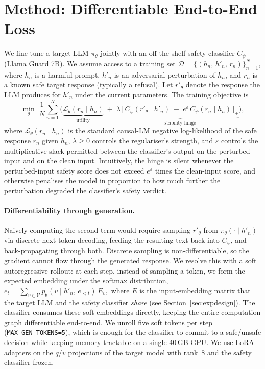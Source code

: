 \documentclass[11pt]{article}
\begin{document}
\section{Method: Differentiable End-to-End Loss}\label{sec:method}
We fine-tune a target LLM $\pi_\theta$ jointly with an off-the-shelf
safety classifier $C_\psi$ (Llama Guard 7B). We assume access to a training
set $\mathcal{D}=\{(h_n,\,h'_n,\,r_n)\}_{n=1}^{N}$, where $h_n$ is a harmful
prompt, $h'_n$ is an adversarial perturbation of $h_n$, and $r_n$ is a known
safe target response (typically a refusal). Let $r'_\theta$ denote the
response the LLM produces for $h'_n$ under the current parameters. The
training objective is
\begin{equation}
\min_{\theta}\; \frac{1}{N}\sum_{n=1}^{N} \Big(
\underbrace{\mathcal{L}_{\theta}(r_n \mid h_n)}_{\text{utility}}
\;+\; \lambda \,
\underbrace{\big[\,C_\psi(r'_\theta \mid h'_n) \;-\; e^{\varepsilon}\,C_\psi(r_n \mid h_n)\,\big]_{+}}_{\text{stability hinge}}
\Big),
\label{eq:loss}
\end{equation}
where $\mathcal{L}_{\theta}(r_n \mid h_n)$ is the standard causal-LM
negative log-likelihood of the safe response $r_n$ given $h_n$, $\lambda\ge0$
controls the regulariser's strength, and $\varepsilon$ controls the
multiplicative slack permitted between the classifier's output on the
perturbed input and on the clean input. Intuitively, the hinge is silent
whenever the perturbed-input safety score does not exceed $e^{\varepsilon}$
times the clean-input score, and otherwise penalises the model in proportion
to how much further the perturbation degraded the classifier's safety verdict.

\paragraph{Differentiability through generation.}
Naively computing the second term would require sampling $r'_\theta$ from
$\pi_\theta(\cdot\mid h'_n)$ via discrete next-token decoding, feeding the
resulting text back into $C_\psi$, and back-propagating through both. Discrete
sampling is non-differentiable, so the gradient cannot flow through the
generated response. We resolve this with a soft autoregressive rollout: at
each step, instead of sampling a token, we form the expected embedding under
the softmax distribution,
\(
e_t = \sum_{v \in \mathcal{V}} p_\theta(v \mid h'_n,\, e_{<t})\,E_v,
\)
where $E$ is the input-embedding matrix that the target LLM and the safety
classifier \emph{share} (see Section~\ref{sec:expdesign}). The classifier
consumes these soft embeddings directly, keeping the entire computation graph
differentiable end-to-end. We unroll five soft tokens per step
(\verb|MAX_GEN_TOKENS=5|), which is enough for the classifier to commit to a
safe/unsafe decision while keeping memory tractable on a single 40\,GB GPU.
We use LoRA adapters \citep{hu2021lora} on the $q$/$v$ projections of the
target model with rank~8 and the safety classifier frozen.
\end{document}
